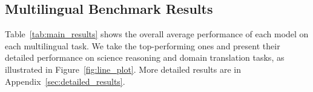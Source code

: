 \subsection{Multilingual Benchmark Results}
Table~\ref{tab:main_results} shows the overall average performance of each model on each multilingual task.
We take the top-performing ones and present their detailed performance on science reasoning and domain translation tasks, as illustrated in Figure~\ref{fig:line_plot}.
More detailed results are in Appendix~\ref{sec:detailed_results}.



